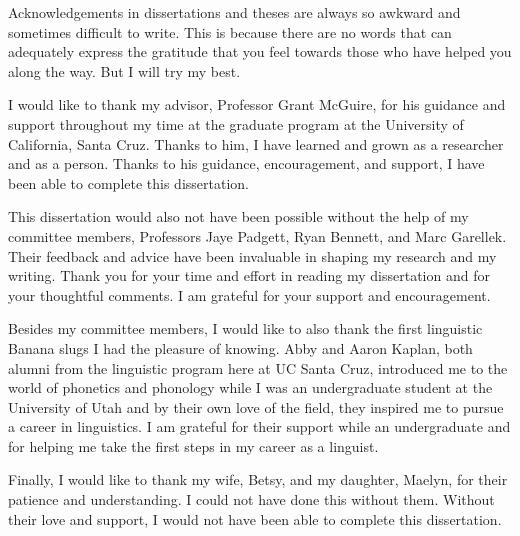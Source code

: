 \begin{acknowledgements}
    Acknowledgements in dissertations and theses are always so awkward and sometimes difficult to write. This is because there are no words that can adequately express the gratitude that you feel towards those who have helped you along the way. But I will try my best.
    
    I would like to thank my advisor, Professor Grant McGuire, for his guidance and support throughout my time at the graduate program at the University of California, Santa Cruz. Thanks to him, I have learned and grown as a researcher and as a person. Thanks to his guidance, encouragement, and support, I have been able to complete this dissertation. 

    This dissertation would also not have been possible without the help of my committee members, Professors Jaye Padgett, Ryan Bennett, and Marc Garellek. Their feedback and advice have been invaluable in shaping my research and my writing. Thank you for your time and effort in reading my dissertation and for your thoughtful comments. I am grateful for your support and encouragement. 

    Besides my committee members, I would like to also thank the first linguistic Banana slugs I had the pleasure of knowing. Abby and Aaron Kaplan, both alumni from the linguistic program here at UC Santa Cruz, introduced me to the world of phonetics and phonology while I was an undergraduate student at the University of Utah and by their own love of the field, they inspired me to pursue a career in linguistics. I am grateful for their support while an undergraduate and for helping me take the first steps in my career as a linguist.


    


    Finally, I would like to thank my wife, Betsy, and my daughter, Maelyn, for their patience and understanding. I could not have done this without them. Without their love and support, I would not have been able to complete this dissertation.
\end{acknowledgements}

